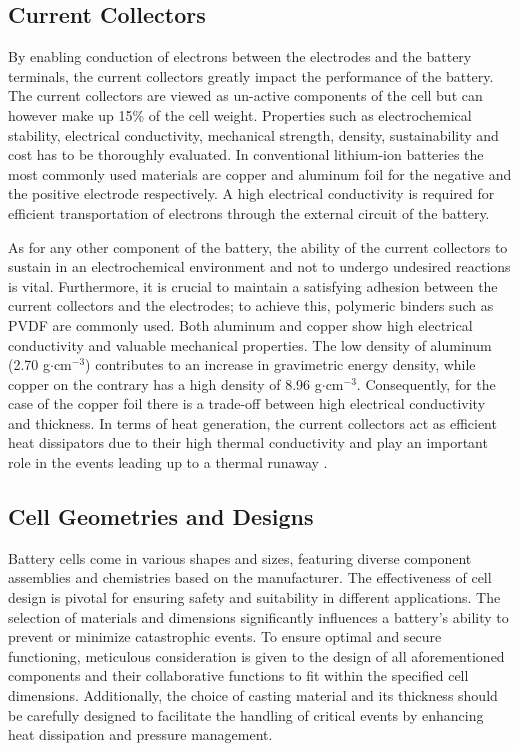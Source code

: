 \subsection{Current Collectors}
\label{sec:current-collectors}
By enabling conduction of electrons between the electrodes and the battery terminals, the current collectors greatly impact the performance of the battery. The current collectors are viewed as un-active components of the cell but can however make up 15\% of the cell weight. Properties such as electrochemical stability, electrical conductivity, mechanical strength, density, sustainability and cost has to be thoroughly evaluated. In conventional lithium-ion batteries the most commonly used materials are copper and aluminum foil for the negative and the positive electrode respectively. A high electrical conductivity is required for efficient transportation of electrons through the external circuit of the battery. 

As for any other component of the battery, the ability of the current collectors to sustain in an electrochemical environment and not to undergo undesired reactions is vital. Furthermore, it is crucial to maintain a satisfying adhesion between the current collectors and the electrodes; to achieve this, polymeric binders such as PVDF are commonly used. Both aluminum and copper show high electrical conductivity and valuable mechanical properties. The low density of aluminum (2.70 g$\cdot$cm$^{-3}$) contributes to an increase in gravimetric energy density, while copper on the contrary has a high density of 8.96 g$\cdot$cm$^{-3}$. Consequently, for the case of the copper foil there is a trade-off between high electrical conductivity and thickness. In terms of heat generation, the current collectors act as efficient heat dissipators due to their high thermal conductivity and play an important role in the events leading up to a thermal runaway \cite{zhu2021review}.

\subsection{Cell Geometries and Designs}
\label{sec:cell-geometries-designs}
Battery cells come in various shapes and sizes, featuring diverse component assemblies and chemistries based on the manufacturer. The effectiveness of cell design is pivotal for ensuring safety and suitability in different applications. The selection of materials and dimensions significantly influences a battery's ability to prevent or minimize catastrophic events. To ensure optimal and secure functioning, meticulous consideration is given to the design of all aforementioned components and their collaborative functions to fit within the specified cell dimensions. Additionally, the choice of casting material and its thickness should be carefully designed to facilitate the handling of critical events by enhancing heat dissipation and pressure management.

